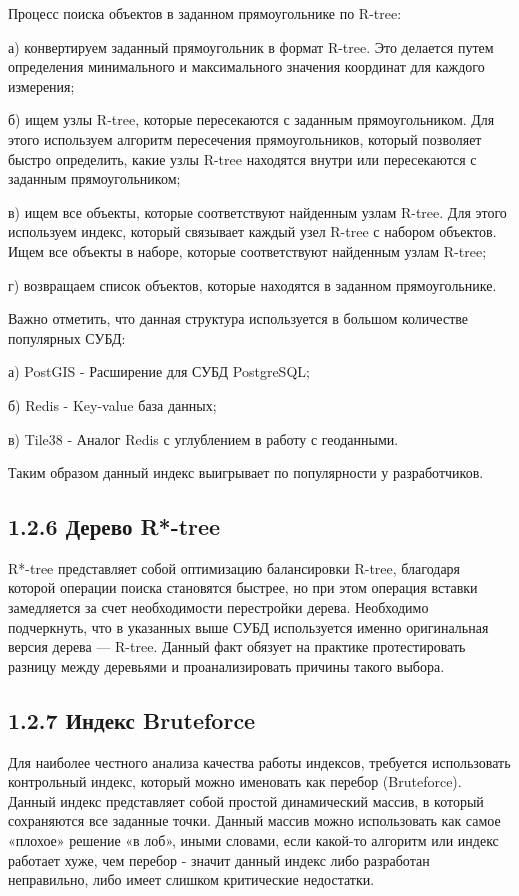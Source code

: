 Процесс поиска объектов в заданном прямоугольнике по R-tree:
\par а) конвертируем заданный прямоугольник в формат R-tree. Это делается путем определения минимального и максимального значения координат для каждого измерения;
\par б) ищем узлы R-tree, которые пересекаются с заданным прямоугольником. Для этого используем алгоритм пересечения прямоугольников, который позволяет быстро определить, какие узлы R-tree находятся внутри или пересекаются с заданным прямоугольником;
\par в) ищем все объекты, которые соответствуют найденным узлам R-tree. Для этого используем индекс, который связывает каждый узел R-tree с набором объектов. Ищем все объекты в наборе, которые соответствуют найденным узлам R-tree;
\par г) возвращаем список объектов, которые находятся в заданном прямоугольнике.


Важно отметить, что данная структура используется в большом количестве популярных СУБД: 
\par а) PostGIS - Расширение для СУБД PostgreSQL;
\par б) Redis - Key-value база данных;
\par в) Tile38 - Аналог Redis с углублением в работу с геоданными.

Таким образом данный индекс выигрывает по популярности у разработчиков. 

\subsection{1.2.6 Дерево R*-tree}
R*-tree представляет собой оптимизацию балансировки R-tree\cite{beckmannRStarTree}, благодаря которой операции поиска становятся быстрее, но при этом операция вставки замедляется за счет необходимости перестройки дерева. Необходимо подчеркнуть, что в указанных выше СУБД используется именно оригинальная версия дерева --- R-tree\cite{sunRStartree}. Данный факт обязует на практике протестировать разницу между деревьями и проанализировать причины такого выбора\cite{fedorovskieRTree}. 

\subsection{1.2.7 Индекс Bruteforce}
Для наиболее честного анализа качества работы индексов, требуется использовать контрольный индекс, который можно именовать как перебор (Bruteforce). Данный индекс представляет собой простой динамический массив, в который сохраняются все заданные точки. Данный массив можно использовать как самое «плохое» решение «в лоб», иными словами, если какой-то алгоритм или индекс работает хуже, чем перебор - значит данный индекс либо разработан неправильно, либо имеет слишком критические недостатки. 

